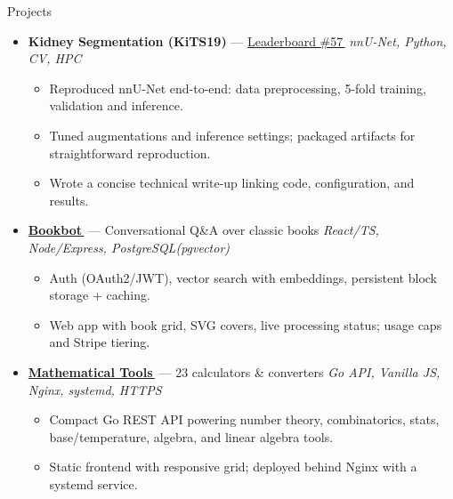\documentclass[]{mcdowellcv}
\newcommand{\linkarrow}{\,\raisebox{0.15ex}{\footnotesize$\nearrow$}} %
\begin{document}
\vspace{-0.1cm}
\begin{cvsection}{Projects}
  \begin{cvsubsection}{}{}{}

    \begin{itemize}
      \item \textbf{Kidney Segmentation (KiTS19)} —
            \href{https://kits19.grand-challenge.org/evaluation/965bcad2-cbb9-42a8-8b56-a777c9f165e2/}{Leaderboard \#57\linkarrow}
            \hfill \emph{\small nnU-Net, Python, CV, HPC}
            \begin{itemize}
              \item Reproduced nnU-Net end-to-end: data preprocessing, 5-fold training, validation and inference.
              \item Tuned augmentations and inference settings; packaged artifacts for straightforward reproduction.
              \item Wrote a concise technical write-up linking code, configuration, and results.
            \end{itemize}

      \item \textbf{\href{https://bots.abaj.ai}{Bookbot\linkarrow}} — Conversational Q\&A over classic books
            \hfill \emph{\small React/TS, Node/Express, PostgreSQL(pgvector)}
            \begin{itemize}
              \item Auth (OAuth2/JWT), vector search with embeddings, persistent block storage + caching.
              \item Web app with book grid, SVG covers, live processing status; usage caps and Stripe tiering.
            \end{itemize}

      \item \textbf{\href{https://tools.abaj.ai}{Mathematical Tools\linkarrow}} — 23 calculators \& converters
            \hfill \emph{\small Go API, Vanilla JS, Nginx, systemd, HTTPS}
            \begin{itemize}
              \item Compact Go REST API powering number theory, combinatorics, stats, base/temperature, algebra, and linear algebra tools.
              \item Static frontend with responsive grid; deployed behind Nginx with a systemd service.
            \end{itemize}


\end{itemize}
\end{cvsubsection}
\end{cvsection}
\end{document}
